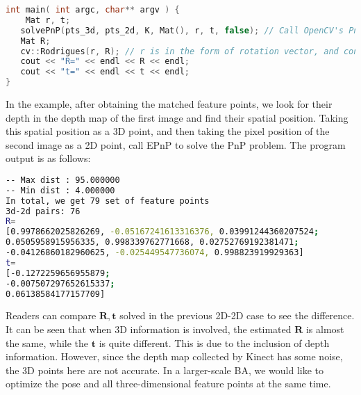 \begin{lstlisting}[language=c++,caption=slambook2/ch7/pose_estimation_3d2d.cpp（片段）]
int main( int argc, char** argv ) {
    Mat r, t;
   solvePnP(pts_3d, pts_2d, K, Mat(), r, t, false); // Call OpenCV's PnP, you can choose from EPNP, DLS and other methods
   Mat R;
   cv::Rodrigues(r, R); // r is in the form of rotation vector, and converted to a rotation matrix by Rodrigues formula
   cout << "R=" << endl << R << endl;
   cout << "t=" << endl << t << endl;
}
\end{lstlisting}

In the example, after obtaining the matched feature points, we look for their depth in the depth map of the first image and find their spatial position. Taking this spatial position as a 3D point, and then taking the pixel position of the second image as a 2D point, call EPnP to solve the PnP problem. The program output is as follows:

\begin{lstlisting}[language=sh,caption=终端输入：]
% build/pose_estimation_3d2d 1.png 2.png d1.png d2.png
-- Max dist : 95.000000 
-- Min dist : 4.000000 
In total, we get 79 set of feature points
3d-2d pairs: 76
R=
[0.9978662025826269, -0.05167241613316376, 0.03991244360207524;
0.0505958915956335, 0.998339762771668, 0.02752769192381471;
-0.04126860182960625, -0.025449547736074, 0.998823919929363]
t=
[-0.1272259656955879;
-0.007507297652615337;
0.06138584177157709]
\end{lstlisting}

Readers can compare $\mathbf{R},\mathbf{t}$ solved in the previous 2D-2D case to see the difference. It can be seen that when 3D information is involved, the estimated $\mathbf{R}$ is almost the same, while the $\mathbf{t}$ is quite different. This is due to the inclusion of depth information. However, since the depth map collected by Kinect has some noise, the 3D points here are not accurate. In a larger-scale BA, we would like to optimize the pose and all three-dimensional feature points at the same time.


